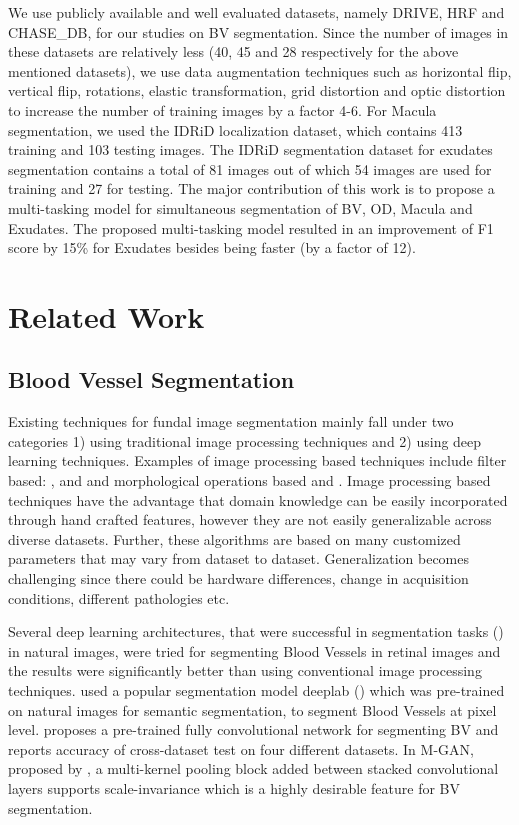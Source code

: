 \documentclass[utf8]{FrontiersinHarvard} %
\begin{document}
We use publicly available and well evaluated datasets, namely DRIVE, HRF and CHASE\_DB, for our studies on BV segmentation. Since the number of images in these datasets are relatively less (40, 45 and 28 respectively for the above mentioned datasets), we use data augmentation techniques such as horizontal flip, vertical flip, rotations, elastic transformation, grid distortion and optic distortion to increase the number of training images by a factor 4-6. For Macula segmentation, we used the IDRiD localization dataset, which contains 413 training and 103 testing images. The IDRiD segmentation dataset for exudates segmentation contains a total of 81 images out of which 54 images are used for training and 27 for testing. 
The major contribution of this work is to propose a multi-tasking model for simultaneous segmentation of BV, OD, Macula and Exudates. The proposed multi-tasking model resulted in an improvement of F1 score by 15\% for Exudates besides being faster (by a factor of 12).

\section{Related Work}
\subsection{Blood Vessel Segmentation}
Existing  techniques for fundal image segmentation mainly fall under two categories 1) using traditional image processing techniques and 2) using deep learning techniques. Examples of image processing based techniques include filter based: \cite{zhang2010retinal}, \cite{yavuz2011retinal} and \cite{aslan2018segmentation} and morphological operations based \cite{hassan2015retinal} and \cite{singh2014new}. Image processing based techniques have the advantage that domain knowledge can be easily incorporated through hand crafted features, however they are not easily generalizable across diverse datasets. Further, these algorithms are based on many customized parameters that may vary from dataset to dataset. Generalization becomes challenging since there could be hardware differences, change in acquisition conditions, different pathologies etc.

Several deep learning architectures, that were successful in segmentation tasks (\cite{chen2017deeplab}) in natural images, were tried for segmenting Blood Vessels in retinal images and the results were significantly better than using conventional image processing techniques. \cite{vengalil2016customizing} used a popular segmentation model deeplab (\cite{chen2017deeplab}) which was pre-trained on natural images  for semantic segmentation,   to segment Blood Vessels at pixel level. \cite {jiang2018retinal} proposes a  pre-trained fully convolutional network for segmenting BV and reports accuracy of cross-dataset test on four different datasets. In M-GAN, proposed by \cite{park2020m}, a multi-kernel pooling block added between stacked convolutional layers supports scale-invariance which is a highly desirable feature for BV segmentation.
\end{document}
